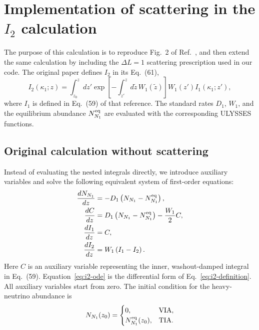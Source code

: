 \section{Implementation of scattering in the $I_2$ calculation}
\label{sec:i2-scattering}

The purpose of this calculation is to reproduce Fig.~2 of
Ref.~\cite{Granelli:2021}, and then extend the same calculation by including the
$\Delta L=1$ scattering prescription used in our code.  The original paper
defines $I_2$ in its Eq.~(61),
\begin{equation}
 I_2(\kappa_1;z)
 = \int_{z_0}^{z} dz'
   \exp\!\left[-\int_{z'}^{z}d\widetilde z\,W_1(\widetilde z)\right]
   W_1(z') I_1(\kappa_1;z'),
 \label{eq:i2-definition}
\end{equation}
where $I_1$ is defined in Eq.~(59) of that reference.  The standard rates
$D_1$, $W_1$, and the equilibrium abundance $N_{N_1}^{\rm eq}$ are evaluated
with the corresponding ULYSSES functions.

\subsection{Original calculation without scattering}

Instead of evaluating the nested integrals directly, we introduce auxiliary
variables and solve the following equivalent system of first-order equations:
\begin{align}
 \frac{dN_{N_1}}{dz}
   &= -D_1\left(N_{N_1}-N_{N_1}^{\rm eq}\right),
 \label{eq:n1-no-scattering}\\
 \frac{dC}{dz}
   &= D_1\left(N_{N_1}-N_{N_1}^{\rm eq}\right)
      -\frac{W_1}{2}C,
 \label{eq:c-no-scattering}\\
 \frac{dI_1}{dz} &= C,
 \label{eq:i1-ode}\\
 \frac{dI_2}{dz} &= W_1\left(I_1-I_2\right).
 \label{eq:i2-ode}
\end{align}
Here $C$ is an auxiliary variable representing the inner, washout-damped
integral in Eq.~(59).  Equation~\eqref{eq:i2-ode} is the differential form of
Eq.~\eqref{eq:i2-definition}.  All auxiliary variables start from zero.  The
initial condition for the heavy-neutrino abundance is
\begin{equation}
 N_{N_1}(z_0)=
 \begin{cases}
  0, & \text{VIA},\\
  N_{N_1}^{\rm eq}(z_0), & \text{TIA}.
 \end{cases}
\end{equation}

